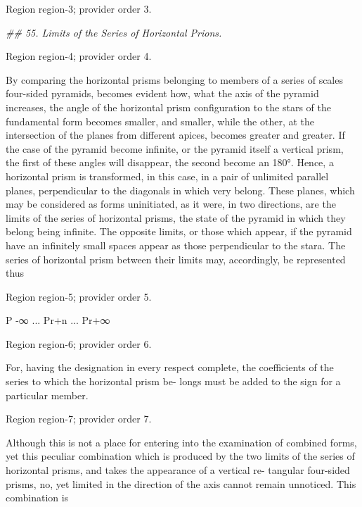 \documentclass[11pt]{article}
\begin{document}
{\scriptsize\color{gray} Region region-3; provider order 3.\par}
\medskip

{\small\itshape \#\# 55. Limits of the Series of Horizontal Prions.\par}

{\scriptsize\color{gray} Region region-4; provider order 4.\par}
\medskip

By comparing the horizontal prisms belonging to members of a series of scales four-sided pyramids, becomes evident how, what the axis of the pyramid increases, the angle of the horizontal prism configuration to the stars of the fundamental form becomes smaller, and smaller, while the other, at the intersection of the planes from different apices, becomes greater and greater. If the case of the pyramid become infinite, or the pyramid itself a vertical prism, the first of these angles will disappear, the second become an 180°. Hence, a horizontal prism is transformed, in this case, in a pair of unlimited parallel planes, perpendicular to the diagonals in which very belong. These planes, which may be considered as forms uninitiated, as it were, in two directions, are the limits of the series of horizontal prisms, the state of the pyramid in which they belong being infinite. The opposite limits, or those which appear, if the pyramid have an infinitely small spaces appear as those perpendicular to the stara. The series of horizontal prism between their limits may, accordingly, be represented thus
\par

{\scriptsize\color{gray} Region region-5; provider order 5.\par}
\medskip

P -∞ ... Pr+n ... Pr+∞
\par

{\scriptsize\color{gray} Region region-6; provider order 6.\par}
\medskip

For, having the designation in every respect complete, the coefficients of the series to which the horizontal prism be- longs must be added to the sign for a particular member.
\par

{\scriptsize\color{gray} Region region-7; provider order 7.\par}
\medskip

Although this is not a place for entering into the examination of combined forms, yet this peculiar combination which is produced by the two limits of the series of horizontal prisms, and takes the appearance of a vertical re- tangular four-sided prisms, no, yet limited in the direction of the axis cannot remain unnoticed. This combination is
\par
\end{document}
